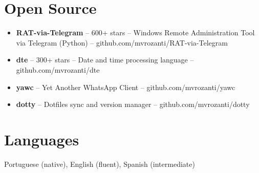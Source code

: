 \documentclass[10pt,a4paper]{article}
\begin{document}
\section{Open Source}
\begin{itemize}
\item \textbf{RAT-via-Telegram} -- 600+ stars -- Windows Remote Administration Tool via Telegram (Python) -- github.com/mvrozanti/RAT-via-Telegram
\item \textbf{dte} -- 300+ stars -- Date and time processing language -- github.com/mvrozanti/dte
\item \textbf{yawc} -- Yet Another WhatsApp Client -- github.com/mvrozanti/yawc
\item \textbf{dotty} -- Dotfiles sync and version manager -- github.com/mvrozanti/dotty
\end{itemize}

\section{Languages}
Portuguese (native), English (fluent), Spanish (intermediate)
\end{document}
